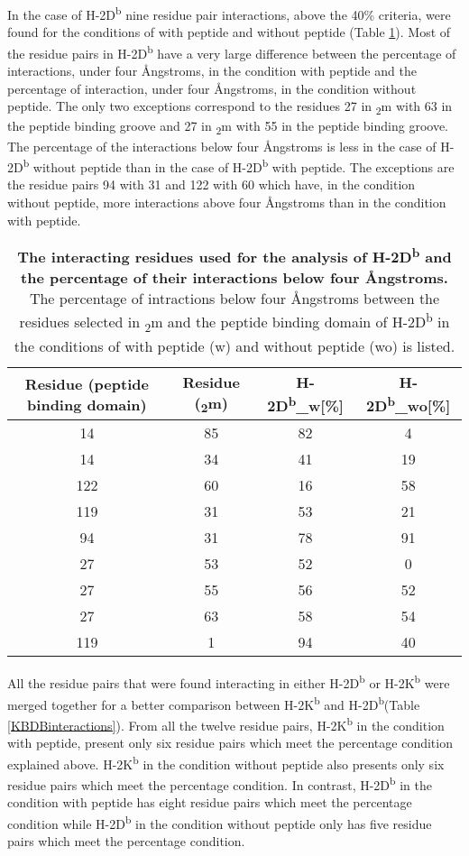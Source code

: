 \documentclass[11pt,twocolumn]{article}
\newcommand{\db}{H-2D\textsuperscript{b}\xspace}
\newcommand{\kb}{H-2K\textsuperscript{b}\xspace}
\newcommand{\angstr}{{\AA}ngstroms\xspace}
\newcommand{\btm}{\textbeta\textsubscript{2}m\xspace}
\begin{document}
In the case of \db nine residue pair interactions, above the 40\% criteria, were found for the conditions of with peptide and without peptide (Table \ref{DBinteractions}). Most of the residue pairs in \db have a very large difference between the percentage of interactions, under four \angstr,  in the condition with peptide and the percentage of interaction, under four \angstr, in the condition without peptide.    
The only two exceptions correspond to the residues 27 in \btm with 63 in the peptide binding groove and 27 in \btm with 55 in the peptide binding groove. The percentage of the interactions below four \angstr is less in the case of \db without peptide than in the case of \db with peptide. The exceptions are the residue pairs 94 with 31 and 122 with 60 which have, in the condition without peptide, more interactions above four \angstr than in the condition with peptide.  
 
 
 
\begin{table}[H]
\caption{\textbf{The interacting residues used for the analysis of \db and the percentage of their interactions below four \angstr. } The percentage of intractions below four \angstr between the residues selected in \btm and the peptide binding domain of \db in the conditions of with peptide (w) and without peptide (wo) is listed.}
\label{DBinteractions}
\centering 
\resizebox{\linewidth}{!} {
\begin{tabular}{|c|c|c|c|}  \hline
Residue (peptide binding domain)&Residue (\btm)&\db{\_}w[\%]&\db{\_}wo[\%]\\ \hline
14&85&82&4\\ \hline
14&34&41&19\\ \hline
122&60&16&58\\ \hline
119&31&53&21\\ \hline
94&31&78&91\\ \hline
27&53&52&0\\ \hline
27&55&56&52\\ \hline
27&63&58&54\\ \hline
119&1&94&40\\ \hline
\end{tabular}
}
\end{table}


All the residue pairs that were found interacting in either \db or \kb were merged together for a better comparison between \kb and \db  (Table \ref{KBDBinteractions}). From all the twelve residue pairs, \kb in the condition with peptide, present only six residue pairs which meet the percentage condition explained above. \kb in the condition without peptide also presents only six residue pairs which meet the percentage condition. In contrast, \db in the condition with peptide has eight residue pairs which meet the percentage condition while \db in the condition without peptide only has five residue pairs which meet the percentage condition. 
\end{document}
